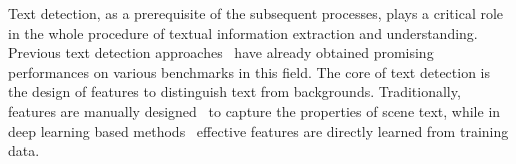 \documentclass[10pt,twocolumn,letterpaper]{article}
\begin{document}
Text detection, as a prerequisite of the subsequent processes, plays a critical role in the whole procedure of textual information extraction and understanding. Previous text detection approaches~\cite{Ref:Busta2015, Ref:Tian2015, Ref:Jaderberg2016B, gupta2016synthetic, Ref:Zhang2016} have already obtained promising performances on various benchmarks in this field. The core of text detection is the design of features to distinguish text from backgrounds. Traditionally, features are manually designed~\cite{Ref:Epshtein2010, Ref:Neumann2010, Ref:Yao2012, Ref:Huang2013, Ref:Neumann2012, Ref:Yin2014} to capture the properties of scene text, while in deep learning based methods~\cite{Ref:Coates2011, Ref:Jaderberg2014, Ref:Huang2014, Ref:Jaderberg2016B, gupta2016synthetic, Ref:Zhang2016} effective features are directly learned from training data.
\end{document}
